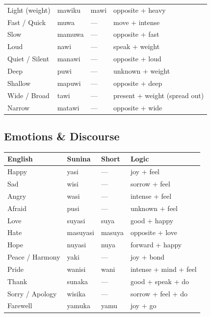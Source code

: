 \documentclass[12pt, a4paper]{article}
\begin{document}
\begin{tabular}{@{}llll@{}}
Light (weight) & mawiku & mawi & opposite + heavy \\
Fast / Quick & muwa & --- & move + intense \\
Slow & mamuwa & --- & opposite + fast \\
Loud & nawi & --- & speak + weight \\
Quiet / Silent & manawi & --- & opposite + loud \\
Deep & puwi & --- & unknown + weight \\
Shallow & mapuwi & --- & opposite + deep \\
Wide / Broad & tawi & --- & present + weight (spread out) \\
Narrow & matawi & --- & opposite + wide \\
\bottomrule
\end{tabular}

\subsection{Emotions \& Discourse}
\begin{tabular}{@{}llll@{}}
\toprule
\textbf{English} & \textbf{Sunina} & \textbf{Short} & \textbf{Logic} \\ \midrule
Happy & yasi & --- & joy + feel \\
Sad & wisi & --- & sorrow + feel \\
Angry & wasi & --- & intense + feel \\
Afraid & pusi & --- & unknown + feel \\
Love & suyasi & suya & good + happy \\
Hate & masuyasi & masuya & opposite + love \\
Hope & nuyasi & nuya & forward + happy \\
Peace / Harmony & yaki & --- & joy + bond \\
Pride & wanisi & wani & intense + mind + feel \\
Thank & sunaka & --- & good + speak + do \\
Sorry / Apology & wisika & --- & sorrow + feel + do \\
Farewell & yamuka & yamu & joy + go \\
\bottomrule
\end{tabular}
\end{document}
